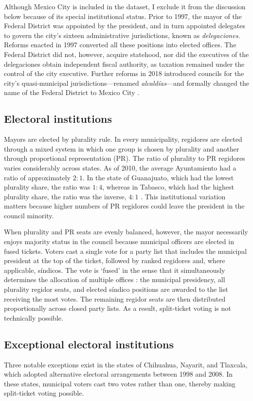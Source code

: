 \documentclass[letter,12pt]{article}
\begin{document}
Although Mexico City is included in the dataset, I exclude it from the discussion below because of its special institutional status. Prior to 1997, the mayor of the Federal District was appointed by the president, and in turn appointed delegates to govern the city’s sixteen administrative jurisdictions, known as \emph{delegaciones}. Reforms enacted in 1997 converted all these positions into elected offices. The Federal District did not, however, acquire statehood, nor did the executives of the delegaciones obtain independent fiscal authority,  as taxation remained under the control of the city executive. Further reforms in 2018 introduced councils for the city's quasi-municipal jurisdictions---renamed \emph{alcaldías}---and formally changed the name of the Federal District to Mexico City \citep{rabell.2017}. 

\subsection{Electoral institutions}
Mayors are elected by plurality rule. In every municipality, regidores are elected through a mixed system in which one group is chosen by plurality and another through proportional representation (PR). The ratio of plurality to PR regidores varies considerably across states. As of 2010, the average Ayuntamiento had a ratio of approximately $2:1$. In the state of Guanajuato, which had the lowest plurality share, the ratio was $1:4$, whereas in Tabasco, which had the highest plurality share, the ratio was the inverse, $4:1$ \citep[][:14]{gil.2010}. This institutional variation matters because higher numbers of PR regidores could leave the president in the council minority.

When plurality and PR seats are evenly balanced, however, the mayor necessarily enjoys majority status in the council because municipal officers are elected in fused tickets. Voters cast a single vote for a party list that includes the municipal president at the top of the ticket, followed by ranked regidores and, where applicable, síndicos. The vote is `fused' in the sense that it simultaneously determines the allocation of multiple offices \citep[see ][:42]{cox.1997}: the municipal presidency, all plurality regidor seats, and elected síndico positions are awarded to the list receiving the most votes. The remaining regidor seats are then distributed proportionally across closed party lists. As a result, split-ticket voting is not technically possible.

\subsection{Exceptional electoral institutions}
Three notable exceptions exist in the states of Chihuahua, Nayarit, and Tlaxcala, which adopted alternative electoral arrangements between 1998 and 2008. In these states, municipal voters cast two votes rather than one, thereby making split-ticket voting possible.
\end{document}
